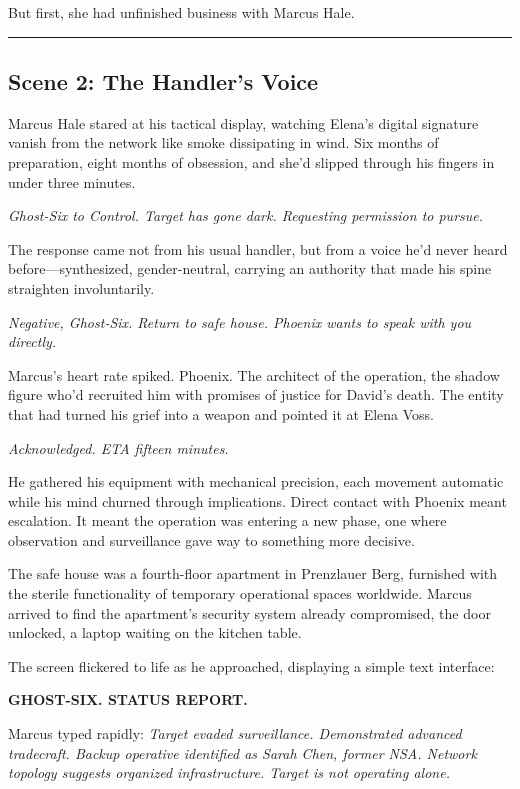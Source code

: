 But first, she had unfinished business with Marcus Hale.

\begin{center}\rule{0.5\linewidth}{0.5pt}\end{center}

\hypertarget{scene-2-the-handlers-voice}{%
\subsection{Scene 2: The Handler's Voice}\label{scene-2-the-handlers-voice}}

Marcus Hale stared at his tactical display, watching Elena's digital signature vanish from the network like smoke dissipating in wind. Six months of preparation, eight months of obsession, and she'd slipped through his fingers in under three minutes.

\emph{Ghost-Six to Control. Target has gone dark. Requesting permission to pursue.}

The response came not from his usual handler, but from a voice he'd never heard before---synthesized, gender-neutral, carrying an authority that made his spine straighten involuntarily.

\emph{Negative, Ghost-Six. Return to safe house. Phoenix wants to speak with you directly.}

Marcus's heart rate spiked. Phoenix. The architect of the operation, the shadow figure who'd recruited him with promises of justice for David's death. The entity that had turned his grief into a weapon and pointed it at Elena Voss.

\emph{Acknowledged. ETA fifteen minutes.}

He gathered his equipment with mechanical precision, each movement automatic while his mind churned through implications. Direct contact with Phoenix meant escalation. It meant the operation was entering a new phase, one where observation and surveillance gave way to something more decisive.

The safe house was a fourth-floor apartment in Prenzlauer Berg, furnished with the sterile functionality of temporary operational spaces worldwide. Marcus arrived to find the apartment's security system already compromised, the door unlocked, a laptop waiting on the kitchen table.

The screen flickered to life as he approached, displaying a simple text interface:

\textbf{GHOST-SIX. STATUS REPORT.}

Marcus typed rapidly: \emph{Target evaded surveillance. Demonstrated advanced tradecraft. Backup operative identified as Sarah Chen, former NSA. Network topology suggests organized infrastructure. Target is not operating alone.}

